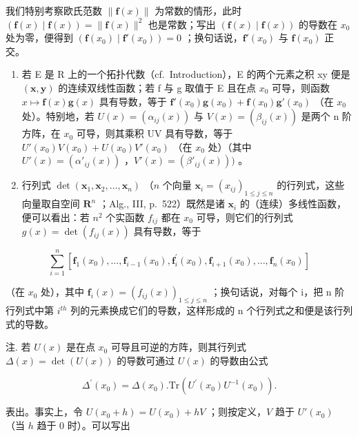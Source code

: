 我们特别考察欧氏范数 \(\|\mathbf{f}(x)\|\) 为常数的情形，此时 \((\mathbf{f}(x) \mid \mathbf{f}(x)) = \|\mathbf{f}(x)\|^{2}\) 也是常数；写出 \((\mathbf{f}(x) \mid \mathbf{f}(x))\) 的导数在 \(x_{0}\) 处为零，便得到 \((\mathbf{f}(x_{0}) \mid \mathbf{f}'(x_{0})) = 0\) ；换句话说，\(\mathbf{f}'(x_{0})\) 与 \(\mathbf{f}(x_{0})\) 正交。

\begin{enumerate}
\def\labelenumi{\arabic{enumi})}
\setcounter{enumi}{3}
\item
  若 E 是 R 上的一个拓扑代数（cf.~Introduction），E 的两个元素之积 xy 便是 \((\mathbf{x}, \mathbf{y})\) 的连续双线性函数；若 f 与 g 取值于 E 且在点 \(x_{0}\) 可导，则函数 \(x \mapsto \mathbf{f}(x)\mathbf{g}(x)\) 具有导数，等于 \(\mathbf{f}'(x_{0})\mathbf{g}(x_{0}) + \mathbf{f}(x_{0})\mathbf{g}'(x_{0})\) （在 \(x_{0}\) 处）。特别地，若 \(U(x) = (\alpha_{ij}(x))\) 与 \(V(x) = (\beta_{ij}(x))\) 是两个 n 阶方阵，在 \(x_{0}\) 可导，则其乘积 UV 具有导数，等于 \(U'(x_{0})V(x_{0}) + U(x_{0})V'(x_{0})\) （在 \(x_{0}\) 处）（其中 \(U'(x) = (\alpha'_{ij}(x))\) ，\(V'(x) = (\beta'_{ij}(x)))\) 。
\item
  行列式 \(\operatorname{det}(\mathbf{x}_1, \mathbf{x}_2, \ldots, \mathbf{x}_n)\) （\(n\) 个向量 \(\mathbf{x}_i = (x_{ij})_{1 \leqslant j \leqslant n}\) 的行列式，这些向量取自空间 \(\mathbf{R}^n\) ；Alg., III, p.~522）既然是诸 \(\mathbf{x}_i\) 的（连续）多线性函数，便可以看出：若 \(n^2\) 个实函数 \(f_{ij}\) 都在 \(x_0\) 可导，则它们的行列式 \(g(x) = \det(f_{ij}(x))\) 具有导数，等于
\end{enumerate}

\[
\sum_ {i = 1} ^ {n} \left[ \mathbf {f} _ {1} (x _ {0}), \dots , \mathbf {f} _ {i - 1} (x _ {0}), \mathbf {f} _ {i} ^ {\prime} (x _ {0}), \mathbf {f} _ {i + 1} (x _ {0}), \dots , \mathbf {f} _ {n} (x _ {0}) \right]
\]

（在 \(x_{0}\) 处），其中 \(\mathbf{f}_{i}(x)=(f_{ij}(x))_{1\leqslant j\leqslant n}\) ；换句话说，对每个 i，把 n 阶行列式中第 \(i^{th}\) 列的元素换成它们的导数，这样形成的 n 个行列式之和便是该行列式的导数。

注. 若 \(U(x)\) 是在点 \(x_{0}\) 可导且可逆的方阵，则其行列式 \(\Delta(x) = \det(U(x))\) 的导数可通过 \(U(x)\) 的导数由公式

\[
\varDelta^ {\prime} (x _ {0}) = \varDelta (x _ {0}). \mathrm{Tr} (U ^ {\prime} (x _ {0}) U ^ {- 1} (x _ {0})).\tag{3}
\]

表出。事实上，令 \(U(x_0 + h) = U(x_0) + hV\) ；则按定义，\(V\) 趋于 \(U'(x_0)\) （当 \(h\) 趋于 0 时）。可以写出

